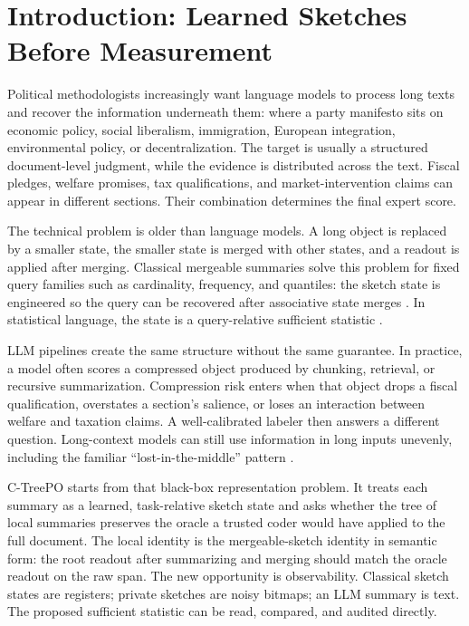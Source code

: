 \section{Introduction: Learned Sketches Before Measurement}\label{sec:min-introduction}

Political methodologists increasingly want language models to process long
texts and recover the information underneath them: where a party manifesto
sits on economic policy, social liberalism, immigration, European integration,
environmental policy, or decentralization. The target is usually a structured
document-level judgment, while the evidence is distributed across the text.
Fiscal pledges, welfare promises, tax qualifications, and market-intervention
claims can appear in different sections. Their combination determines the
final expert score.

The technical problem is older than language models. A long object is replaced
by a smaller state, the smaller state is merged with other states, and a
readout is applied after merging. Classical mergeable summaries solve this
problem for fixed query families such as cardinality, frequency, and quantiles:
the sketch state is engineered so the query can be recovered after associative
state merges \citep{Agarwal2013MergeableTODS}. In statistical language, the
state is a query-relative sufficient statistic \citep{Fisher1922,Blackwell1953}.

LLM pipelines create the same structure without the same guarantee. In
practice, a model often scores a compressed object produced by chunking,
retrieval, or recursive summarization. Compression risk enters when that
object drops a fiscal qualification, overstates a section's salience, or loses
an interaction between welfare and taxation claims. A well-calibrated labeler
then answers a different question. Long-context models can still use
information in long inputs unevenly, including the familiar
``lost-in-the-middle'' pattern \citep{LiuEtAl2024LostMiddle}.

C-TreePO starts from that black-box representation problem. It treats each
summary as a learned, task-relative sketch state and asks whether the tree of
local summaries preserves the oracle a trusted coder would have applied to the
full document. The local identity is the mergeable-sketch identity in semantic
form: the root readout after summarizing and merging should match the oracle
readout on the raw span. The new opportunity is observability. Classical
sketch states are registers; private sketches are noisy bitmaps; an LLM
summary is text. The proposed sufficient statistic can be read, compared, and
audited directly.

